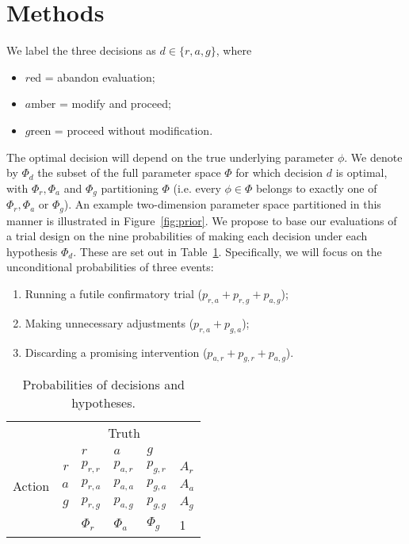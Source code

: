 \documentclass{article} %
\begin{document}
\section{Methods}

We label the three decisions as $d \in \{r, a, g\}$, where
\begin{itemize}
\item $r$ed = abandon evaluation;
\item $a$mber = modify and proceed;
\item $g$reen = proceed without modification.
\end{itemize}
The optimal decision will depend on the true underlying parameter $\phi$. We denote by $\Phi_{d}$ the subset of the full parameter space $\Phi$ for which decision $d$ is optimal, with $\Phi_{r}, \Phi_{a}$ and $\Phi_{g}$ partitioning $\Phi$ (i.e. every $\phi \in \Phi$ belongs to exactly one of $\Phi_{r}, \Phi_{a}$ or $\Phi_{g}$). An example two-dimension parameter space partitioned in this manner is illustrated in Figure~\ref{fig:prior}. We propose to base our evaluations of a trial design on the nine probabilities of making each decision under each hypothesis $\Phi_{d}$. These are set out in Table~\ref{tab:probs}. Specifically, we will focus on the unconditional probabilities of three events:
\begin{enumerate}
\item Running a futile confirmatory trial ($p_{r,a} + p_{r,g} + p_{a,g}$);
\item Making unnecessary adjustments ($p_{r,a} + p_{g,a}$);
\item Discarding a promising intervention ($p_{a,r} + p_{g,r} + p_{a,g}$).
\end{enumerate}

\begin{table}
\centering
\begin{tabular}{r r l l l l}
\toprule
& & \multicolumn{3}{c}{Truth} & \\
& & $r$ & $a$ & $g$ & \\
\midrule
\multirow{3}{*}{Action} & $r$ & $p_{r,r}$ & $p_{a,r}$ & $p_{g,r}$ & $A_{r}$ \\
 & $a$ & $p_{r,a}$ & $p_{a,a}$ & $p_{g,a}$ & $A_{a}$ \\
 & $g$ & $p_{r,g}$ & $p_{a,g}$ & $p_{g,g}$ & $A_{g}$ \\
 \midrule
 & & $\Phi_{r}$ & $\Phi_{a}$ & $\Phi_{g}$ & 1 \\
\bottomrule
\end{tabular}
\caption{Probabilities of decisions and hypotheses.}
\label{tab:probs}
\end{table}
\end{document}
